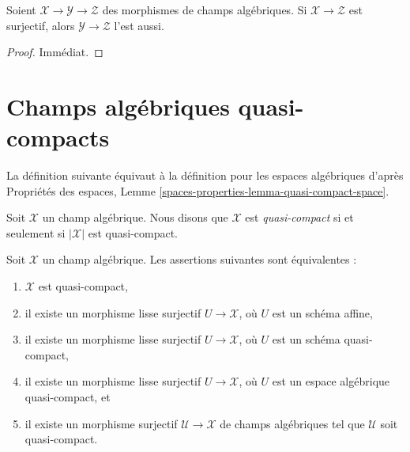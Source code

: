 \begin{lemma}
\label{lemma-surjective-permanence}
Soient $\mathcal{X} \to \mathcal{Y} \to \mathcal{Z}$ des morphismes de
champs algébriques. Si $\mathcal{X} \to \mathcal{Z}$ est surjectif,
alors $\mathcal{Y} \to \mathcal{Z}$ l'est aussi.
\end{lemma}

\begin{proof}
Immédiat.
\end{proof}












\section{Champs algébriques quasi-compacts}
\label{section-quasi-compact}

\noindent
La définition suivante équivaut à la définition pour les espaces
algébriques d'après
Propriétés des espaces, Lemme \ref{spaces-properties-lemma-quasi-compact-space}.

\begin{definition}
\label{definition-quasi-compact}
Soit $\mathcal{X}$ un champ algébrique.
Nous disons que $\mathcal{X}$ est {\it quasi-compact}
si et seulement si $|\mathcal{X}|$ est quasi-compact.
\end{definition}

\begin{lemma}
\label{lemma-quasi-compact-stack}
Soit $\mathcal{X}$ un champ algébrique.
Les assertions suivantes sont équivalentes :
\begin{enumerate}
\item $\mathcal{X}$ est quasi-compact,
\item il existe un morphisme lisse surjectif $U \to \mathcal{X}$,
où $U$ est un schéma affine,
\item il existe un morphisme lisse surjectif $U \to \mathcal{X}$,
où $U$ est un schéma quasi-compact,
\item il existe un morphisme lisse surjectif $U \to \mathcal{X}$,
où $U$ est un espace algébrique quasi-compact, et
\item il existe un morphisme surjectif $\mathcal{U} \to \mathcal{X}$
de champs algébriques tel que $\mathcal{U}$ soit quasi-compact.
\end{enumerate}
\end{lemma}

